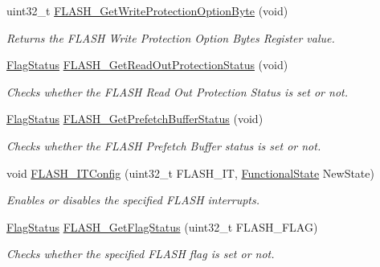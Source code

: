 \begin{DoxyCompactItemize}
uint32\+\_\+t \hyperlink{group___f_l_a_s_h___exported___functions_gac009e061562c7d36d7d2d00bb1c8aafa}{F\+L\+A\+S\+H\+\_\+\+Get\+Write\+Protection\+Option\+Byte} (void)
\begin{DoxyCompactList}\small\item\em Returns the F\+L\+A\+SH Write Protection Option Bytes Register value. \end{DoxyCompactList}\item 
\hyperlink{group___exported__types_ga89136caac2e14c55151f527ac02daaff}{Flag\+Status} \hyperlink{group___f_l_a_s_h___exported___functions_ga57fe56770ff25b358f3e36bd70632e37}{F\+L\+A\+S\+H\+\_\+\+Get\+Read\+Out\+Protection\+Status} (void)
\begin{DoxyCompactList}\small\item\em Checks whether the F\+L\+A\+SH Read Out Protection Status is set or not. \end{DoxyCompactList}\item 
\hyperlink{group___exported__types_ga89136caac2e14c55151f527ac02daaff}{Flag\+Status} \hyperlink{group___f_l_a_s_h___exported___functions_ga289bffe7f078d6a130222f03c59bc235}{F\+L\+A\+S\+H\+\_\+\+Get\+Prefetch\+Buffer\+Status} (void)
\begin{DoxyCompactList}\small\item\em Checks whether the F\+L\+A\+SH Prefetch Buffer status is set or not. \end{DoxyCompactList}\item 
void \hyperlink{group___f_l_a_s_h___exported___functions_ga94c1e51a9c3bf8d48eb6eb4a4d054861}{F\+L\+A\+S\+H\+\_\+\+I\+T\+Config} (uint32\+\_\+t F\+L\+A\+S\+H\+\_\+\+IT, \hyperlink{group___exported__types_gac9a7e9a35d2513ec15c3b537aaa4fba1}{Functional\+State} New\+State)
\begin{DoxyCompactList}\small\item\em Enables or disables the specified F\+L\+A\+SH interrupts. \end{DoxyCompactList}\item 
\hyperlink{group___exported__types_ga89136caac2e14c55151f527ac02daaff}{Flag\+Status} \hyperlink{group___f_l_a_s_h___exported___functions_gae3fb545e32f21501ca27d4380e0f2088}{F\+L\+A\+S\+H\+\_\+\+Get\+Flag\+Status} (uint32\+\_\+t F\+L\+A\+S\+H\+\_\+\+F\+L\+AG)
\begin{DoxyCompactList}\small\item\em Checks whether the specified F\+L\+A\+SH flag is set or not. \end{DoxyCompactList}\item 

\end{DoxyCompactItemize}
